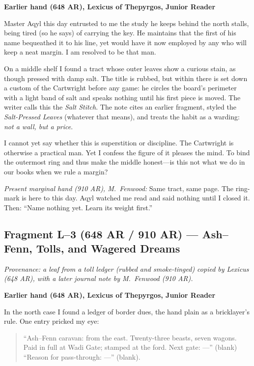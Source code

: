 \documentclass[11pt]{article}
\begin{document}
\medskip
\noindent\textbf{Earlier hand (648 AR), Lexicus of Thepyrgos, Junior Reader}

Master Aqyl this day entrusted to me the study he keeps behind the north stalls, being tired (so he says) of carrying the key. He maintains that the first of his name bequeathed it to his line, yet would have it now employed by any who will keep a neat margin. I am resolved to be that man.

On a middle shelf I found a tract whose outer leaves show a curious stain, as though pressed with damp salt. The title is rubbed, but within there is set down a custom of the Cartwright before any game: he circles the board's perimeter with a light band of salt and speaks nothing until his first piece is moved. The writer calls this the \textit{Salt Stitch}. The note cites an earlier fragment, styled the \textit{Salt-Pressed Leaves} (whatever that means), and treats the habit as a warding: \emph{not a wall, but a price}.

I cannot yet say whether this is superstition or discipline. The Cartwright is otherwise a practical man. Yet I confess the figure of it pleases the mind. To bind the outermost ring and thus make the middle honest---is this not what we do in our books when we rule a margin?

\medskip
\noindent\textit{Present marginal hand (910 AR), M.\ Fenwood:} Same tract, same page. The ring-mark is here to this day. Aqyl watched me read and said nothing until I closed it. Then: ``Name nothing yet. Learn its weight first.''


\subsection*{Fragment L--3 (648 AR / 910 AR) --- Ash--Fenn, Tolls, and Wagered Dreams}
\label{frag:l3}
{}

\noindent\textit{Provenance: a leaf from a toll ledger (rubbed and smoke-tinged) copied by Lexicus (648 AR), with a later journal note by M.\ Fenwood (910 AR).}

\medskip
\noindent\textbf{Earlier hand (648 AR), Lexicus of Thepyrgos, Junior Reader}

In the north case I found a ledger of border dues, the hand plain as a bricklayer’s rule. One entry pricked my eye:

\begin{quote}
\small
``Ash--Fenn caravan: from the east. Twenty-three beasts, seven wagons. Paid in full at Wadi Gate; stamped at the ford. Next gate: ---'' (blank) ``Reason for pass-through: ---'' (blank).
\end{quote}
\end{document}
